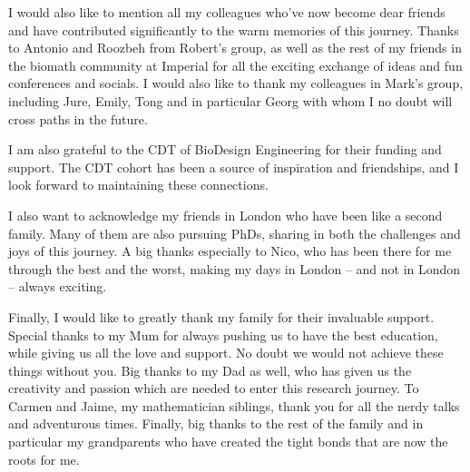 \documentclass[
    11pt,
    oneside, %
    english,
    onehalfspacing, %
parskip, %
]{PhDDoctoralThesis}
\begin{document}
        I would also like to mention all my colleagues who've now become dear friends and have contributed significantly to the warm memories of this journey.
       Thanks to Antonio and Roozbeh from Robert's group, as well as the rest of my friends in the biomath community at Imperial for all the exciting exchange of ideas and fun conferences and socials.
       I would also like to thank my colleagues in Mark's group, including Jure, Emily, Tong and in particular Georg with whom I no doubt will cross paths in the future.

       I am also grateful to the CDT of BioDesign Engineering for their funding and support.
       The CDT cohort has been a source of inspiration and friendships, and I look forward to maintaining these connections.

       I also want to acknowledge my friends in London who have been like a second family.
       Many of them are also pursuing PhDs, sharing in both the challenges and joys of this journey.
       A big thanks especially to Nico, who has been there for me through the best and the worst, making my days in London – and not in London – always exciting.


Finally, I would like to greatly thank my family for their invaluable support.
       Special thanks to my Mum for always pushing us to have the best education, while giving us all the love and support.
       No doubt we would not achieve these things without you.
       Big thanks to my Dad as well, who has given us the creativity and passion which are needed to enter this research journey.
       To Carmen and Jaime, my mathematician siblings, thank you for all the nerdy talks and adventurous times.
       Finally, big thanks to the rest of the family and in particular my grandparents who have created the tight bonds that are now the roots for me.



    \tableofcontents





    \mainmatter %

    \pagestyle{thesis} %

    \clearpage

    
    
    
    
    
    

    \printglossary[type=\acronymtype]

    \printbibliography[heading=bibintoc]
    
\end{document}
